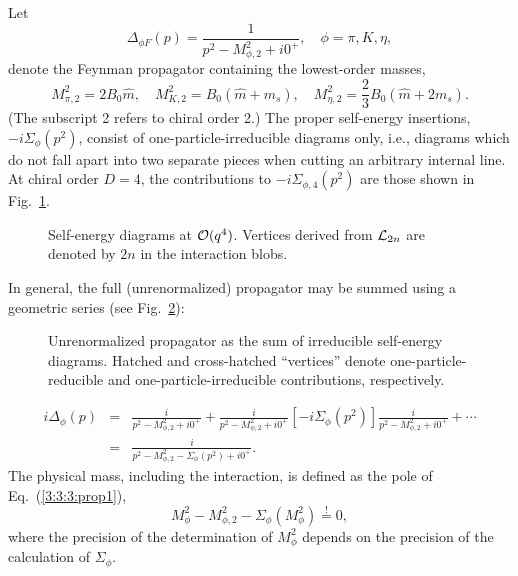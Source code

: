\documentclass[twoside,12pt]{article}
\begin{document}
   Let
\begin{equation}
\label{3:3:3:propF}
\Delta_{\phi F}(p)=\frac{1}{p^2-M^2_{\phi,2}+i0^+},\quad \phi=\pi,K,\eta,
\end{equation}
denote the Feynman propagator containing the lowest-order masses,
\begin{displaymath}
M^2_{\pi,2}=2 B_0 \hat m,\quad
M^2_{K,2}=B_0(\hat m+m_s),\quad
M^2_{\eta,2}=\frac{2}{3} B_0\left(\hat m+2m_s\right).
\end{displaymath}
   (The subscript 2 refers to chiral order 2.)
   The proper self-energy insertions,
$-i\Sigma_\phi(p^2)$, consist of one-particle-irreducible
diagrams only, i.e., diagrams which do not fall apart into
two separate pieces when cutting an arbitrary internal line.
   At chiral order $D=4$, the contributions to
$-i\Sigma_{\phi,4}(p^2)$ are those shown in Fig.\ \ref{3:3:3:selfenergy}.
\begin{figure}[t]
\begin{center}
\caption{\label{3:3:3:selfenergy}
Self-energy diagrams at ${\cal O}(q^4)$.
   Vertices derived from ${\cal L}_{2n}$ are denoted by $2n$ in the
interaction blobs.}
\end{center}
\end{figure}
   In general, the full (unrenormalized) propagator may be summed using a geometric series (see
Fig.\ \ref{3:3:3:fullprop}):
\begin{figure}[t]
\begin{center}
\caption{\label{3:3:3:fullprop}
Unrenormalized propagator as the sum of irreducible self-energy diagrams.
Hatched and cross-hatched ``vertices'' denote one-particle-reducible
and one-particle-irreducible contributions, respectively.}
\end{center}
\end{figure}
\begin{eqnarray}
\label{3:3:3:prop1}
i\Delta_\phi(p)&=&\frac{i}{p^2-M^2_{\phi,2}+i0^+}+\frac{i}{p^2-M^2_{\phi,2}+i0^+}
[-i\Sigma_\phi(p^2)]\frac{i}{p^2-M^2_{\phi,2}+i0^+}+\cdots\nonumber\\
&=&
\frac{i}{p^2-M^2_{\phi,2}-\Sigma_\phi(p^2)+i0^+}.
\end{eqnarray}
   The physical mass, including the interaction, is defined as the pole of Eq.\ (\ref{3:3:3:prop1}),
\begin{equation}
\label{3:3:3:mdef}
M^2_\phi-M^2_{\phi,2}-\Sigma_\phi(M^2_\phi)\stackrel{!}{=}0,
\end{equation}
where the precision of the determination of $M^2_\phi$ depends on the precision of
the calculation of $\Sigma_\phi$.
\end{document}
